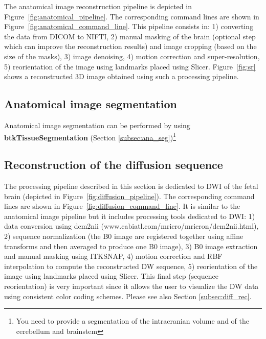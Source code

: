   \begin{figure*}[!htb]
   \caption{Command lines corresponding to the processing pipeline for anatomical data in BTK. On the left are shown the blocks used in the anatomical data pipeline (Figure~\ref{fig:anatomical_pipeline}) and on the right the correspond command lines.}
   \label{fig:anatomical_command_line}
 \end{figure*}
 

The anatomical image reconstruction pipeline is depicted in Figure~\ref{fig:anatomical_pipeline}. The corresponding command lines are shown in Figure~\ref{fig:anatomical_command_line}. This pipeline consists in: 1) converting the data from DICOM to NIFTI, 2) manual masking of the brain (optional step which can improve the reconstruction results) and image cropping (based on the size of the masks), 3) image denoising, 4) motion correction and super-resolution, 5) reorientation of the image using landmarks placed using Slicer. Figure~\ref{fig:sr} shows a reconstructed 3D image obtained using such a processing pipeline.


\subsection{Anatomical image segmentation}
Anatomical image segmentation can be performed by using \textbf{btkTissueSegmentation} (Section \ref{subsec:ana_seg})\footnote{You need to provide a segmentation of the intracranian volume and of the cerebellum and brainstem}


\subsection{Reconstruction of the diffusion sequence}

The processing pipeline described in this section is dedicated to DWI of the fetal brain (depicted in Figure~\ref{fig:diffusion_pipeline}). The corresponding command lines are shown in Figure~\ref{fig:diffusion_command_line}. It is similar to the anatomical image pipeline but it includes processing tools dedicated to DWI: 1) data conversion using dcm2nii (www.cabiatl.com/mricro/mricron/dcm2nii.html), 2) sequence normalization (the B0 image are registered together using affine transforms and then averaged to produce one B0 image), 3) B0 image extraction and manual masking using ITKSNAP, 4) motion correction and RBF interpolation to compute the reconstructed DW sequence, 5) reorientation of the image using landmarks placed using Slicer. This final step (sequence reorientation) is very important since it allows the user to visualize the DW data using consistent color coding schemes. Please see also Section \ref{subsec:diff_rec}. 

